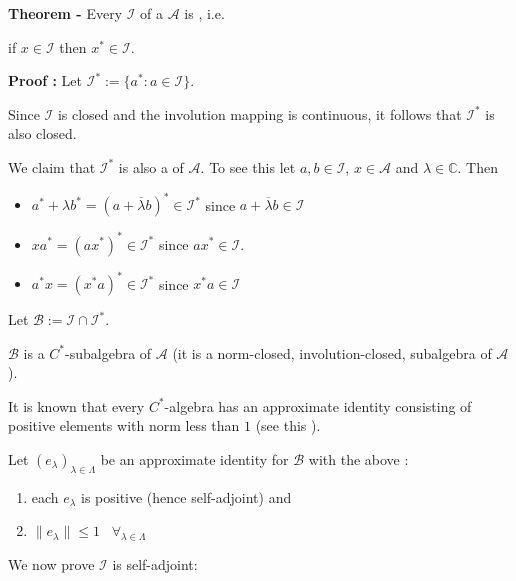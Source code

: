 \documentclass[12pt]{article}
\begin{document}

{\bf Theorem -} Every   $\mathcal{I}$ of a  $\mathcal{A}$ is , i.e.
\begin{center}
if $x \in \mathcal{I}$ then $x^* \in \mathcal{I}$.

\end{center}

{\bf Proof :} Let $\mathcal{I}^* := \{a^* : a \in \mathcal{I}\}$.

Since $\mathcal{I}$ is closed and the involution mapping is continuous, it follows that $\mathcal{I}^*$ is also closed.

We claim that $\mathcal{I}^*$ is also a  of $\mathcal{A}$. To see this let $a,b \in \mathcal{I}$, $x \in \mathcal{A}$ and $\lambda \in \mathbb{C}$. Then
\begin{itemize}
\item $a^* + \lambda b^* = (a+\overline{\lambda}b)^* \in \mathcal{I}^*$ since $a + \overline{\lambda} b \in \mathcal{I}$ 
\item $xa^* =(ax^*)^* \in \mathcal{I}^*$ since $ax^* \in \mathcal{I}$.
\item $a^*x=(x^*a)^* \in \mathcal{I}^*$ since $x^*a \in \mathcal{I}$
\end{itemize}

Let $\mathcal{B} := \mathcal{I} \cap \mathcal{I}^*$.

$\mathcal{B}$ is a $C^*$-subalgebra of $\mathcal{A}$ (it is a norm-closed, involution-closed, subalgebra of $\mathcal{A}$).

It is known that every $C^*$-algebra has an approximate identity consisting of positive elements with norm less than $1$ (see this ).

Let $(e_{\lambda})_{\lambda \in \Lambda}$ be an approximate identity for $\mathcal{B}$ with the above :
\begin{enumerate}
\item each $e_{\lambda}$ is positive (hence self-adjoint) and
\item $\|e_{\lambda}\| \leq 1\;\;\;\forall_{\lambda \in \Lambda}$
\end{enumerate}  

We now prove $\mathcal{I}$ is self-adjoint:
\end{document}
